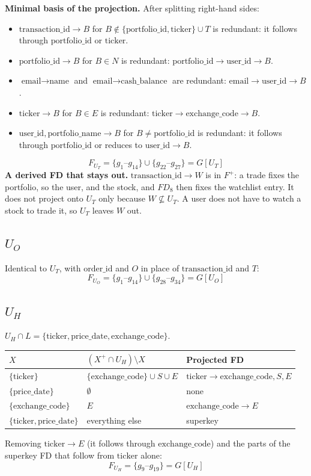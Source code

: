 \documentclass{article}
\newcommand{\at}[1]{\text{#1}}
\newcommand{\gr}[2]{g_{#1}\text{--}g_{#2}}
\begin{document}
\textbf{Minimal basis of the projection.} After splitting right-hand sides:
\begin{itemize}[leftmargin=*]
  \item $\at{transaction\_id} \rightarrow B$ for $B \notin \{\at{portfolio\_id}, \at{ticker}\} \cup T$ is redundant: it follows through $\at{portfolio\_id}$ or $\at{ticker}$.
  \item $\at{portfolio\_id} \rightarrow B$ for $B \in N$ is redundant: $\at{portfolio\_id} \rightarrow \at{user\_id} \rightarrow B$.
  \item $\at{email} \rightarrow \at{name}$ and $\at{email} \rightarrow \at{cash\_balance}$ are redundant: $\at{email} \rightarrow \at{user\_id} \rightarrow B$.
  \item $\at{ticker} \rightarrow B$ for $B \in E$ is redundant: $\at{ticker} \rightarrow \at{exchange\_code} \rightarrow B$.
  \item $\at{user\_id}, \at{portfolio\_name} \rightarrow B$ for $B \neq \at{portfolio\_id}$ is redundant: it follows through $\at{portfolio\_id}$ or reduces to $\at{user\_id} \rightarrow B$.
\end{itemize}
\[
  F_{U_T} = \{\gr{1}{14}\} \cup \{\gr{22}{27}\} = G[U_T]
\]
\textbf{A derived FD that stays out.} $\at{transaction\_id} \rightarrow W$ is in $F^+$: a trade fixes the portfolio, so the user, and the stock, and $FD_8$ then fixes the watchlist entry. It does not project onto $U_T$ only because $W \not\subseteq U_T$. A user does not have to watch a stock to trade it, so $U_T$ leaves $W$ out.

\subsection{$U_O$}

Identical to $U_T$, with $\at{order\_id}$ and $O$ in place of $\at{transaction\_id}$ and $T$:
\[
  F_{U_O} = \{\gr{1}{14}\} \cup \{\gr{28}{34}\} = G[U_O]
\]

\subsection{$U_H$}

$U_H \cap L = \{\at{ticker}, \at{price\_date}, \at{exchange\_code}\}$.
\begin{center}
\begin{tabular}{l l l}
  \toprule
  $X$ & $(X^+ \cap U_H) \setminus X$ & \textbf{Projected FD} \\
  \midrule
  $\{\at{ticker}\}$ & $\{\at{exchange\_code}\} \cup S \cup E$ & $\at{ticker} \rightarrow \at{exchange\_code}, S, E$ \\
  $\{\at{price\_date}\}$ & $\emptyset$ & none \\
  $\{\at{exchange\_code}\}$ & $E$ & $\at{exchange\_code} \rightarrow E$ \\
  $\{\at{ticker}, \at{price\_date}\}$ & everything else & superkey \\
  \bottomrule
\end{tabular}
\end{center}
Removing $\at{ticker} \rightarrow E$ (it follows through $\at{exchange\_code}$) and the parts of the superkey FD that follow from $\at{ticker}$ alone:
\[
  F_{U_H} = \{\gr{9}{19}\} = G[U_H]
\]
\end{document}
